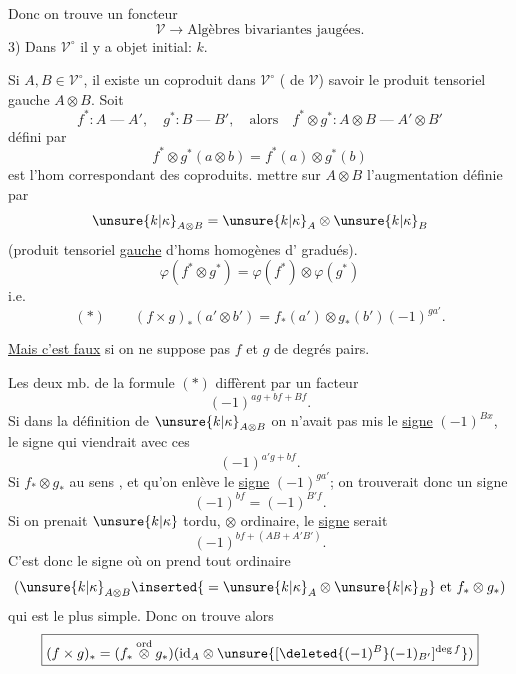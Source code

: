 Donc on trouve un foncteur 
\[
\mathcal V\longrightarrow\text{Algèbres bivariantes jaugées}.
\]
3) Dans $\mathcal V^\circ$  il y a objet initial: $k$.

Si $A,B\in\mathcal V^\circ$, il existe un coproduit dans $\mathcal V^\circ$ ( de $\mathcal V$) savoir le produit tensoriel gauche $A\otimes B$. Soit
\[
f^*:A\mathbin{\text{---}}A',\quad g^*:B\mathbin{\text{---}}B',\quad\text{alors}\quad
f^*\otimes g^*:A\otimes B\mathbin{\text{---}}A'\otimes B'
\]
défini par
\[
f^*\otimes g^*(a\otimes b)=f^*(a)\otimes g^*(b)
\]
est l'hom correspondant des coproduits.   mettre sur $A\otimes B$ l'augmentation définie par
\[
\unsure{k|\kappa}_{A\otimes B}=\unsure{k|\kappa}_A\otimes\unsure{k|\kappa}_B
\]
(produit tensoriel \uline{gauche} d'homs homogènes d' gradués).
\quad{}
\[
\varphi(f^*\otimes g^*)=\varphi(f^*)\otimes\varphi(g^*)
\]
i.e.
\[
(*)\qquad(f\times g)_*(a'\otimes b')=f_*(a')\otimes g_*(b')(-1)^{ga'}.
\]

\uline{Mais c'est faux} si on ne suppose pas $f$ et $g$ de degrés pairs.

Les deux mb. de la formule $(*)$ diffèrent par un facteur
\[
(-1)^{ag+bf+Bf}.
\]
Si dans la définition de $\unsure{k|\kappa}_{A\otimes B}$ on n'avait pas mis le \uline{signe} $(-1)^{Bx}$, le signe qui viendrait avec ces 
\[
(-1)^{a'g+bf}.
\]
Si   $f_*\otimes g_*$ au sens , et qu'on  enlève le \uline{signe} $(-1)^{ga'}$; on trouverait donc un signe
\[
(-1)^{bf}=(-1)^{B'f}.
\]
Si on prenait $\unsure{k|\kappa}$ tordu, $\otimes$ ordinaire, le \uline{signe} serait
\[
(-1)^{bf+(AB+A'B')}.
\]
C'est donc le signe où on prend tout ordinaire
\[
(\unsure{k|\kappa}_{A\otimes B}\inserted{{}=\unsure{k|\kappa}_A\otimes\unsure{k|\kappa}_B}\text{ et }f_*\otimes g_*)
\]
qui est le plus simple. Donc on trouve alors
\[
\boxed{(f\times g)_*=(f_*\overset{\mathrm{ord}}\otimes g_*)
(\mathrm{id}_A\otimes\unsure{[\deleted{(-1)^B}(-1)_{B'}]^{\deg f}})}
\]
